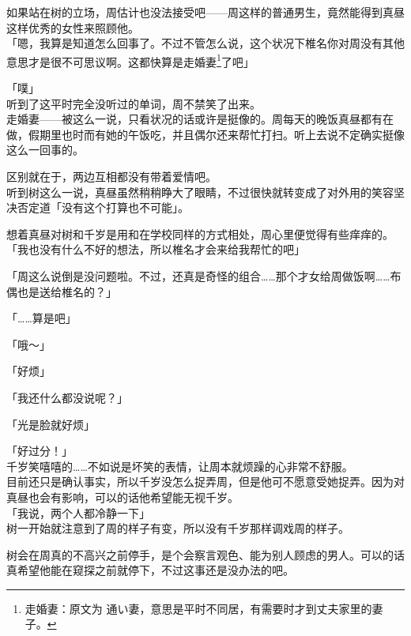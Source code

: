如果站在树的立场，周估计也没法接受吧——周这样的普通男生，竟然能得到真昼这样优秀的女性来照顾他。\\

「嗯，我算是知道怎么回事了。不过不管怎么说，这个状况下椎名你对周没有其他意思才是很不可思议啊。这都快算是走婚妻\footnote{走婚妻：原文为 {\jpfont 通い妻}，意思是平时不同居，有需要时才到丈夫家里的妻子。}了吧」

「噗」\\

听到了这平时完全没听过的单词，周不禁笑了出来。\\

走婚妻——被这么一说，只看状况的话或许是挺像的。周每天的晚饭真昼都有在做，假期里也时而有她的午饭吃，并且偶尔还来帮忙打扫。听上去说不定确实挺像这么一回事的。

区别就在于，两边互相都没有带着爱情吧。\\

听到树这么一说，真昼虽然稍稍睁大了眼睛，不过很快就转变成了对外用的笑容坚决否定道「没有这个打算也不可能」。

想着真昼对树和千岁是用和在学校同样的方式相处，周心里便觉得有些痒痒的。\\

「我也没有什么不好的想法，所以椎名才会来给我帮忙的吧」

「周这么说倒是没问题啦。不过，还真是奇怪的组合……那个才女给周做饭啊……布偶也是送给椎名的？」

「……算是吧」

「哦～」

「好烦」

「我还什么都没说呢？」

「光是脸就好烦」

「好过分！」\\

千岁笑嘻嘻的……不如说是坏笑的表情，让周本就烦躁的心非常不舒服。\\

目前还只是确认事实，所以千岁没怎么捉弄周，但是他可不愿意受她捉弄。因为对真昼也会有影响，可以的话他希望能无视千岁。\\

「我说，两个人都冷静一下」\\

树一开始就注意到了周的样子有变，所以没有千岁那样调戏周的样子。

树会在周真的不高兴之前停手，是个会察言观色、能为别人顾虑的男人。可以的话真希望他能在窥探之前就停下，不过这事还是没办法的吧。\\

